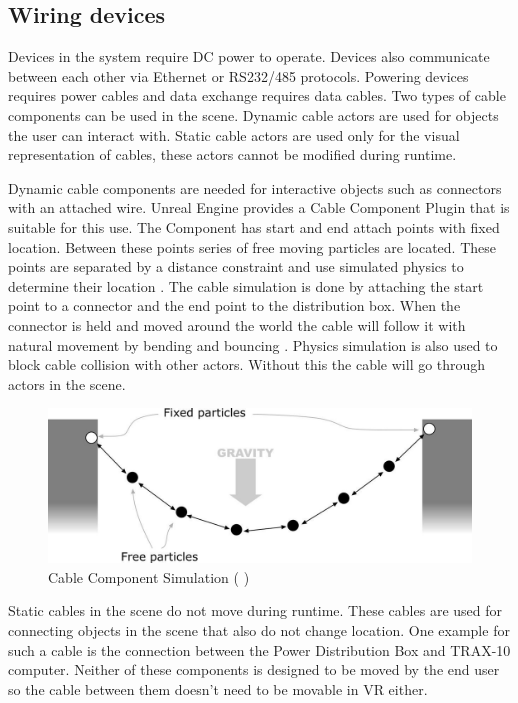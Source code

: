 \documentclass[12pt, a4paper,oneside, nocenter]{thesis}
\newcommand{\citeyeartitlexamkinline}[1]{(\usebibentry{#1}{title} \citeyear{#1})}
\begin{document}
\subsection{Wiring devices} \label{wiring-devices-section}
Devices in the system require DC power to operate. Devices also communicate between each other via Ethernet or RS232/485 protocols. Powering devices requires power cables and data exchange requires data cables. Two types of cable components can be used in the scene. Dynamic cable actors are used for objects the user can interact with. Static cable actors are used only for the visual representation of cables, these actors cannot be modified during runtime.
\par
Dynamic cable components are needed for interactive objects such as connectors with an attached wire. Unreal Engine provides a Cable Component Plugin that is suitable for this use. The Component has start and end attach points with fixed location. Between these points series of free moving particles are located. These points are separated by a distance constraint and use simulated physics to determine their location . The cable simulation is done by attaching the start point to a connector and the end point to the distribution box. When the connector is held and moved around the world the cable will follow it with natural movement by bending and bouncing . Physics simulation is also used to block cable collision with other actors. Without this the cable will go through actors in the scene.
\begin{figure}[H]
	\includegraphics[width=\textwidth]{particle-rope}
	\caption{Cable Component Simulation \citeyeartitlexamkinline{cable-component}}
	\label{fig:particle-rope}
\end{figure}
\par
Static cables in the scene do not move during runtime. These cables are used for connecting objects in the scene that also do not change location. One example for such a cable is the connection between the Power Distribution Box and TRAX-10 computer. Neither of these components is designed to be moved by the end user so the cable between them doesn't need to be movable in VR either.
\end{document}
